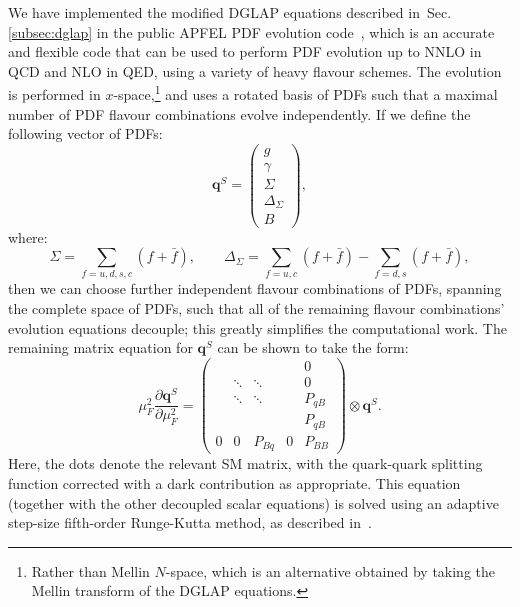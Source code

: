 \documentclass[withindex,glossary]{cam-thesis}
\renewcommand{\vec}[1]{\textbf{#1}} %
\begin{document}
We have implemented the modified DGLAP equations described in~Sec. \ref{subsec:dglap} in the
public APFEL PDF evolution code~\cite{Bertone:2013vaa}, which is an accurate and flexible code that can be used to perform PDF evolution up to NNLO
in QCD and NLO in QED, using a variety of heavy flavour schemes.
The evolution is performed in $x$-space,\footnote{Rather than Mellin $N$-space, which is an alternative obtained by taking the Mellin transform of the DGLAP equations.} and uses a rotated 
basis of PDFs such that a maximal number of PDF flavour combinations
evolve independently. If we define the following vector of PDFs:
\begin{equation}
\label{eq:singlet}
\vec{q}^S = \begin{pmatrix} g \\ \gamma \\ \Sigma \\ \Delta_{\Sigma} \\ B\end{pmatrix},
\end{equation}
where:
\begin{equation}
\label{eq:singlet2}
\Sigma = \sum_{f=u,d,s,c} (f + \bar{f}), \qquad \Delta_{\Sigma} = \sum_{f=u,c} (f + \bar{f}) - \sum_{f=d,s} (f + \bar{f}),
\end{equation}
then we can choose further independent flavour combinations of PDFs, spanning the
complete space of PDFs, such that all of the remaining flavour combinations' evolution equations decouple;
 this greatly simplifies the computational work. The remaining matrix equation for $\vec{q}^S$ can 
 be shown to take the form:
 \renewcommand{\arraystretch}{0.8}
\begin{equation}
\label{eq:dglapevolution}
\mu_F^2 \frac{\partial \vec{q}^S}{\partial \mu_F^2} = \left(\begin{array}{cccc|c} & & & &  0 \\ & \ddots& \ddots& & 0 \\ & \ddots& \ddots& & P_{q B} \\[1ex] & & & & P_{q B} \\[1ex] \hline 0 & 0 & P_{Bq} & 0 & P_{BB} \end{array}\right) \otimes \vec{q}^S.
\end{equation}
Here, the dots denote the relevant SM matrix, with the quark-quark splitting function corrected with a dark contribution as appropriate. This equation (together with the other decoupled scalar equations) is solved using an adaptive step-size fifth-order Runge-Kutta method, 
as described in~\cite{Bertone:2013vaa}.%
\end{document}
